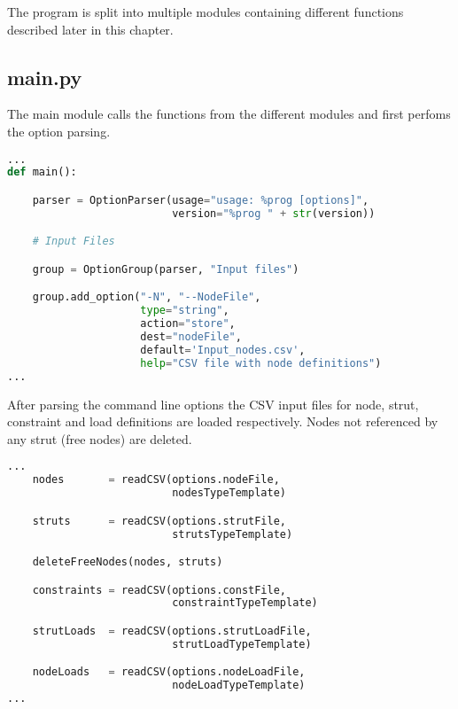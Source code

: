 The program is split into multiple modules containing different functions described later in this chapter.

\subsection{main.py}
\label{subsec:main.py}

The main module calls the functions from the different modules and first perfoms the option parsing.

\begin{inconsolata}
\begin{lstlisting}[language=python]
...
def main():

    parser = OptionParser(usage="usage: %prog [options]",
                          version="%prog " + str(version))

    # Input Files                                       

    group = OptionGroup(parser, "Input files")

    group.add_option("-N", "--NodeFile",
                     type="string",
                     action="store",
                     dest="nodeFile",
                     default='Input_nodes.csv',
                     help="CSV file with node definitions")
...
\end{lstlisting}
\end{inconsolata}

After parsing the command line options the CSV input files for node, strut, constraint and load definitions are loaded respectively.
Nodes not referenced by any strut (free nodes) are deleted.

\begin{inconsolata}
\begin{lstlisting}[language=python]
...
    nodes       = readCSV(options.nodeFile,
                          nodesTypeTemplate)

    struts      = readCSV(options.strutFile,
                          strutsTypeTemplate)

    deleteFreeNodes(nodes, struts)

    constraints = readCSV(options.constFile,
                          constraintTypeTemplate)

    strutLoads  = readCSV(options.strutLoadFile,
                          strutLoadTypeTemplate)

    nodeLoads   = readCSV(options.nodeLoadFile,
                          nodeLoadTypeTemplate)
...
\end{lstlisting}
\end{inconsolata}


